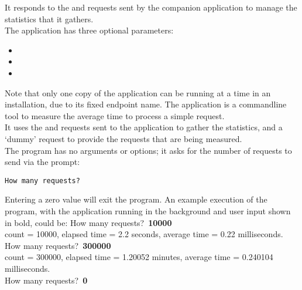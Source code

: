 It responds to the  and
 requests sent by the
companion application  to manage the statistics
that it gathers.\\

The application has three optional parameters:
\begin{itemize}
\item{}
\item\exSp{}
\item\exSp{}
\end{itemize}
Note that only one copy of the  application can be
running at a time in an \mplusm{} installation, due to its fixed endpoint name.
The  application is a command\longDash{}line tool to
measure the average time to process a simple request.\\

It uses the  and
 requests sent to the
 application to gather the statistics, and a
`dummy' request to provide the requests that are being measured.\\

The program has no arguments or options; it asks for the number of requests to send via
the prompt:
\outputBegin{}
\begin{verbatim}
How many requests?
\end{verbatim}
\outputEnd{}
Entering a zero value will exit the program.
An example execution of the program, with the 
application running in the background and user input shown in bold, could be:
\outputBegin{}
How many requests?\ \textbf{10000}\\
count = 10000, elapsed time = 2.2 seconds, average time = 0.22 milliseconds.\\
How many requests?\ \textbf{300000}\\
count = 300000, elapsed time = 1.20052 minutes, average time = 0.240104 milliseconds.\\
How many requests?\ \textbf{0}
\outputEnd{}
\secondaryEnd{}
\primaryEnd{}
